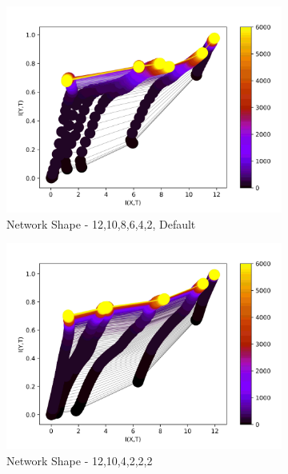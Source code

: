 \documentclass[dissertation.tex]{subfiles}
\begin{document}
\begin{figure}[ht]
  \centering
  \begin{subfigure}[t]{0.32\textwidth}
    \centering
    \includegraphics[width=\textwidth]{figs/eval/networkShapeRelu/KDE1.jpg}
    \caption{
      Network Shape - 12,10,8,6,4,2, Default
    }
  \end{subfigure}
  \hfill
  \begin{subfigure}[t]{0.32\textwidth}
    \centering
    \includegraphics[width=\textwidth]{figs/eval/networkShapeRelu/KDE2.jpg}
    \caption{
      Network Shape - 12,10,4,2,2,2
    }
  \end{subfigure}
  \hfill
  \begin{subfigure}[t]{0.32\textwidth}

\end{subfigure}
\end{figure}
\end{document}
